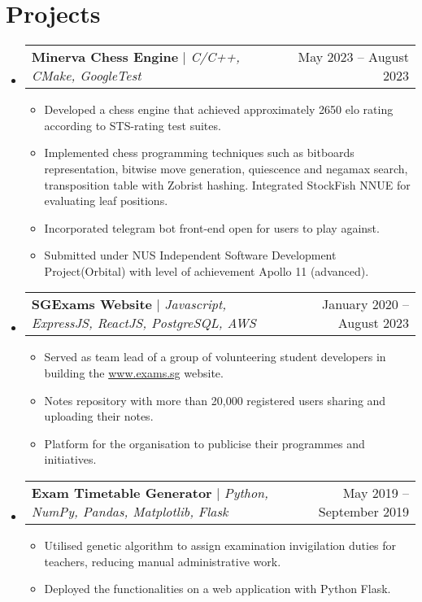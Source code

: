 \documentclass[letterpaper,11pt]{article}
\makeatletter
\newcommand{\resumeItem}[1]{
  \item\footnotesize{
    {#1 \vspace{-2pt}}
  }
}
\newcommand{\resumeProjectHeading}[2]{
    \item
    \begin{tabular*}{0.97\textwidth}{l@{\extracolsep{\fill}}r}
      \small#1 & #2 \\
    \end{tabular*}\vspace{-6pt}
}
\newcommand{\resumeSubHeadingListStart}{\begin{itemize}[leftmargin=0.15in, label={}]}
\newcommand{\resumeSubHeadingListEnd}{\end{itemize}}
\newcommand{\resumeItemListStart}{\begin{itemize}}
\newcommand{\resumeItemListEnd}{\end{itemize}\vspace{-7pt}}
\makeatother
\begin{document}
\section{Projects}
    \resumeSubHeadingListStart
      \resumeProjectHeading
          {\textbf{Minerva Chess Engine} $|$ \emph{C/C++, CMake, GoogleTest}}{May 2023 -- August 2023}
          \resumeItemListStart
            \resumeItem{Developed a chess engine that achieved approximately 2650 elo rating according to STS-rating test suites.}
            \resumeItem{Implemented chess programming techniques such as bitboards representation, bitwise move generation, quiescence and negamax search, transposition table with Zobrist hashing. Integrated StockFish NNUE for evaluating leaf positions.}
            \resumeItem{Incorporated telegram bot front-end open for users to play against.}
            \resumeItem{Submitted under NUS Independent Software Development Project(Orbital) with level of achievement Apollo 11 (advanced).}
          \resumeItemListEnd
      \resumeProjectHeading
          {\textbf{SGExams Website} $|$ \emph{Javascript, ExpressJS, ReactJS, PostgreSQL, AWS}}{January 2020 -- August 2023}
          \resumeItemListStart
            \resumeItem{Served as team lead of a group of volunteering student developers in building the \href{https://www.exams.sg}{www.exams.sg} website.}
            \resumeItem{Notes repository with more than 20,000 registered users sharing and uploading their notes.}
            \resumeItem{Platform for the organisation to publicise their programmes and initiatives.}
          \resumeItemListEnd
      \resumeProjectHeading
          {\textbf{Exam Timetable Generator} $|$ \emph{Python, NumPy, Pandas, Matplotlib, Flask}}{May 2019 -- September 2019}
          \resumeItemListStart
            \resumeItem{Utilised genetic algorithm to assign examination invigilation duties for teachers, reducing manual administrative work.}
            \resumeItem{Deployed the functionalities on a web application with Python Flask.}
          \resumeItemListEnd
    \resumeSubHeadingListEnd


\end{document}
